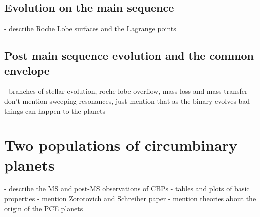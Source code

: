 \subsection{Evolution on the main sequence}
\label{sub:Evolution on the main sequence}
- describe Roche Lobe surfaces and the Lagrange points

\subsection{Post main sequence evolution and the common envelope}
\label{sub:Post main sequence evolution and the common envelope}
- branches of stellar evolution, roche lobe overflow, mass loss
and mass transfer
- don't mention sweeping resonances, just mention that as the binary
evolves bad things can happen to the planets

\section{Two populations of circumbinary planets}
\label{sec:Two populations of circumbinary planets}
- describe the MS and post-MS observations of CBPs
- tables and plots of basic properties
- mention Zorotovich and Schreiber paper
- mention theories about the origin of the PCE planets
